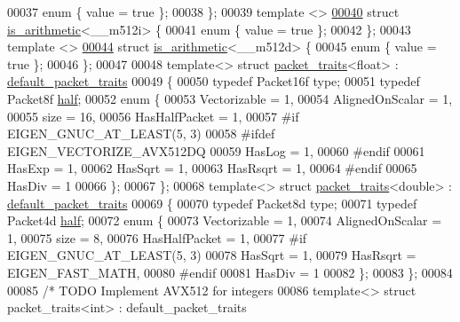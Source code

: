 \begin{DoxyCode}
00037   \textcolor{keyword}{enum} \{ value = \textcolor{keyword}{true} \};
00038 \};
00039 \textcolor{keyword}{template} <>
\hyperlink{struct_eigen_1_1internal_1_1is__arithmetic_3_01____m512i_01_4}{00040} \textcolor{keyword}{struct }\hyperlink{struct_eigen_1_1internal_1_1is__arithmetic}{is\_arithmetic}<\_\_m512i> \{
00041   \textcolor{keyword}{enum} \{ value = \textcolor{keyword}{true} \};
00042 \};
00043 \textcolor{keyword}{template} <>
\hyperlink{struct_eigen_1_1internal_1_1is__arithmetic_3_01____m512d_01_4}{00044} \textcolor{keyword}{struct }\hyperlink{struct_eigen_1_1internal_1_1is__arithmetic}{is\_arithmetic}<\_\_m512d> \{
00045   \textcolor{keyword}{enum} \{ value = \textcolor{keyword}{true} \};
00046 \};
00047 
00048 \textcolor{keyword}{template}<> \textcolor{keyword}{struct }\hyperlink{struct_eigen_1_1internal_1_1packet__traits}{packet\_traits}<float>  : \hyperlink{struct_eigen_1_1internal_1_1default__packet__traits}{default\_packet\_traits}
00049 \{
00050   \textcolor{keyword}{typedef} Packet16f type;
00051   \textcolor{keyword}{typedef} Packet8f \hyperlink{struct_eigen_1_1half}{half};
00052   \textcolor{keyword}{enum} \{
00053     Vectorizable = 1,
00054     AlignedOnScalar = 1,
00055     size = 16,
00056     HasHalfPacket = 1,
00057 \textcolor{preprocessor}{#if EIGEN\_GNUC\_AT\_LEAST(5, 3)}
00058 \textcolor{preprocessor}{#ifdef EIGEN\_VECTORIZE\_AVX512DQ}
00059     HasLog = 1,
00060 \textcolor{preprocessor}{#endif}
00061     HasExp = 1,
00062     HasSqrt = 1,
00063     HasRsqrt = 1,
00064 \textcolor{preprocessor}{#endif}
00065     HasDiv = 1
00066   \};
00067  \};
00068 \textcolor{keyword}{template}<> \textcolor{keyword}{struct }\hyperlink{struct_eigen_1_1internal_1_1packet__traits}{packet\_traits}<double> : \hyperlink{struct_eigen_1_1internal_1_1default__packet__traits}{default\_packet\_traits}
00069 \{
00070   \textcolor{keyword}{typedef} Packet8d type;
00071   \textcolor{keyword}{typedef} Packet4d \hyperlink{struct_eigen_1_1half}{half};
00072   \textcolor{keyword}{enum} \{
00073     Vectorizable = 1,
00074     AlignedOnScalar = 1,
00075     size = 8,
00076     HasHalfPacket = 1,
00077 \textcolor{preprocessor}{#if EIGEN\_GNUC\_AT\_LEAST(5, 3)}
00078     HasSqrt = 1,
00079     HasRsqrt = EIGEN\_FAST\_MATH,
00080 \textcolor{preprocessor}{#endif}
00081     HasDiv = 1
00082   \};
00083 \};
00084 
00085 \textcolor{comment}{/* TODO Implement AVX512 for integers}
00086 \textcolor{comment}{template<> struct packet\_traits<int>    : default\_packet\_traits}

\end{DoxyCode}
